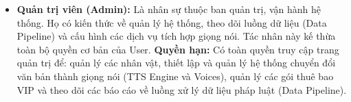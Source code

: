 \begin{itemize}
\item \textbf{Quản trị viên (Admin):}
Là nhân sự thuộc ban quản trị, vận hành hệ thống.
Họ có kiến thức
về quản lý hệ thống,
theo dõi luồng dữ liệu (Data Pipeline)
và cấu hình các dịch vụ tích hợp giọng nói.
Tác nhân này kế thừa toàn bộ quyền cơ bản của User.
\textbf{Quyền hạn:}
Có toàn quyền truy cập trang quản trị để:
quản lý các nhân vật,
thiết lập và quản lý hệ thống chuyển đổi văn bản thành giọng nói
(TTS Engine và Voices),
quản lý các gói thuê bao VIP
và theo dõi các báo cáo về luồng xử lý dữ liệu pháp luật (Data Pipeline).
\end{itemize}
